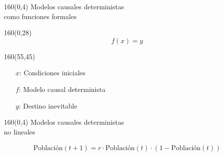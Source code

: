 \documentclass[shownotes,aspectratio=169]{beamer}
\begin{document}
\begin{frame}[plain]
 \begin{textblock}{160}(0,4)
 \centering \LARGE
 Modelos causales deterministas \\  \Large como funciones formales
\end{textblock}
\vspace{0.75cm}


\begin{textblock}{160}(0,28)
\begin{equation*}
 f(x) = y
\end{equation*}
\end{textblock}

\begin{textblock}{160}(55,45)
\centering
\begin{itemize}
 \item[$x$:] 
    {Condiciones iniciales} 
 \item[$f$:] 
    {Modelo causal determinista}
 \item[$y$:] 
    {Destino inevitable}
\end{itemize}
\end{textblock}



\end{frame}


\begin{frame}[plain]
 \begin{textblock}{160}(0,4)
 \centering \LARGE
 Modelos causales deterministas \\  \Large no lineales
\end{textblock}
\vspace{0.75cm}

\begin{align*}
 \text{Población}(t+1) = r \cdot \text{Población}(t)\cdot (1-\text{Población}(t))
\end{align*}

\vspace{0.5cm}

\pause

\centering

 


\end{frame}
\end{document}
